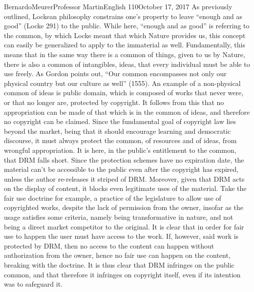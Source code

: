 \documentclass[12pt,letterpaper]{article}
\begin{document}
\begin{mla}{Bernardo}{Meurer}{Professor Martin}{English 110}{October 17, 2017}
        As previously outlined, Lockean philosophy constrains one's property to leave ``enough and as good'' (Locke 291) to the public. While here, ``enough and as good'' is referring to the common, by which Locke meant that which Nature provides us, this concept can easily be generalized to apply to the immaterial as well. Fundamentally, this means that in the same way there is a common of things, given to us by Nature, there is also a common of intangibles, ideas, that every individual must be able to use freely. As Gordon points out, ``Our common encompasses not only our physical country but our culture as well'' (1555). An example of a non-physical common of ideas is public domain, which is composed of works that never were, or that no longer are, protected by copyright. It follows from this that no appropriation can be made of that which is in the common of ideas, and therefore no copyright can be claimed. Since the fundamental goal of copyright law lies beyond the market, being that it should encourage learning and democratic discourse, it must always protect the common, of resources and of ideas, from wrongful appropriation. It is here, in the public's entitlement to the common, that DRM falls short. Since the protection schemes have no expiration date, the material can't be accessible to the public even after the copyright has expired, unless the author re-releases it striped of DRM. Moreover, given that DRM acts on the display of content, it blocks even legitimate uses of the material. Take the fair use doctrine for example, a practice of the legislature to allow use of copyrighted works, despite the lack of permission from the owner, insofar as the usage satisfies some criteria, namely being transformative in nature, and not being a direct market competitor to the original. It is clear that in order for fair use to happen the user must have access to the work. If, however, said work is protected by DRM, then no access to the content can happen without authorization from the owner, hence no fair use can happen on the content, breaking with the doctrine. It is thus clear that DRM infringes on the public common, and that therefore it infringes on copyright itself, even if its intention was to safeguard it.
    

\end{mla}
\end{document}
